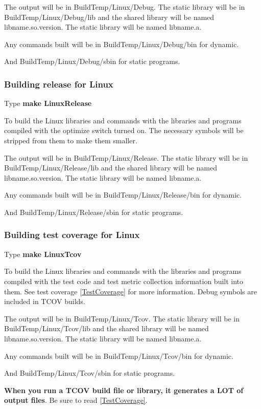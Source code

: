 The output will be in BuildTemp/Linux/Debug.
The static library will be in BuildTemp/Linux/Debug/lib
and the shared library will be named lib{name}.so.{version}.
The static library will be named lib{name}.a.
  
Any commands built will be in BuildTemp/Linux/Debug/bin
for dynamic.

And BuildTemp/Linux/Debug/sbin for static programs.

\subsubsection{Building release for Linux}
Type \textbf{make LinuxRelease}

To build the Linux libraries and commands with the libraries
and programs compiled with the optimize switch turned on.
The necessary symbols will be stripped from them to make
them smaller.

The output will be in BuildTemp/Linux/Release.
The static library will be in BuildTemp/Linux/Release/lib
and the shared library will be named lib{name}.so.{version}.
The static library will be named lib{name}.a.
  
Any commands built will be in BuildTemp/Linux/Release/bin
for dynamic.

And BuildTemp/Linux/Release/sbin for static programs.

\subsubsection{Building test coverage for Linux}
Type \textbf{make LinuxTcov}

To build the Linux libraries and commands with the libraries
and programs compiled with the test code and test metric
collection information built into them.
See test coverage \ref{TestCoverage} for more information.
Debug symbols are included in TCOV builds.

The output will be in BuildTemp/Linux/Tcov.
The static library will be in BuildTemp/Linux/Tcov/lib
and the shared library will be named lib{name}.so.{version}.
The static library will be named lib{name}.a.

Any commands built will be in BuildTemp/Linux/Tcov/bin
for dynamic.

And BuildTemp/Linux/Tcov/sbin for static programs.

\textbf{When you run a TCOV build file or library, it generates a LOT of  output files}. Be sure to read \ref{TestCoverage}.
  
